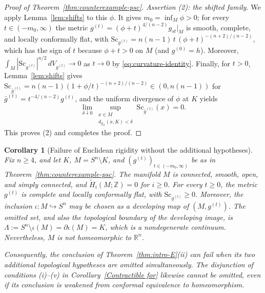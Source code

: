 \documentclass[12pt,oneside,a4paper]{article}
\theoremstyle{mytheorem}
\newtheorem{corollary}[definition]{Corollary}
\theoremstyle{remark}
\theoremstyle{definition}
\begin{document}
\begin{proof}[Proof of Theorem~\ref{thm:counterexample-psc}]
\smallskip\noindent\emph{Assertion (2): the shifted family.}
We apply Lemma~\ref{lem:shifts} to this $\phi$.  It gives
$m_0=\inf_M\phi>0$; for every $t\in(-m_0,\infty)$ the metric
$g^{(t)}=(\phi+t)^{4/(n-2)}g_{st}|_M$ is smooth, complete, and
locally conformally flat, with
$\mathrm{Sc}_{g^{(t)}}=n(n-1)\,t\,(\phi+t)^{-(n+2)/(n-2)},$
which has the sign of $t$ because $\phi+t>0$ on $M$ (and $g^{(0)}=h$).
Moreover,
$\int_M|\mathrm{Sc}_{g^{(t)}}|^{n/2}\,dV_{g^{(t)}}\to0$ as $t\to0$
by \eqref{eq:curvature-identity}.  Finally, for $t>0$,
Lemma~\ref{lem:shifts} gives
$\mathrm{Sc}_{\bar g^{(t)}}=n(n-1)(1+\phi/t)^{-(n+2)/(n-2)}\in(0,n(n-1))$
for $\bar g^{(t)}=t^{-4/(n-2)}g^{(t)}$, and the uniform divergence of
$\phi$ at $K$ yields
\[
 \lim_{\delta\downarrow0}
 \sup_{\substack{x\in M\\ d_{g_{st}}(x,K)<\delta}}
 \mathrm{Sc}_{\bar g^{(t)}}(x)=0.
\]
This proves (2) and completes the proof.
\end{proof}


\begin{corollary}[Failure of Euclidean rigidity without the
additional hypotheses]\label{cor:sharpness}
Fix $n\geq4$, and let $K$, $M=S^n\setminus K$, and
$(g^{(t)})_{t\in(-m_0,\infty)}$ be as in Theorem~\ref{thm:counterexample-psc}.  The
manifold $M$ is connected, smooth, open, and simply connected, and
\(\widetilde H_i(M;\mathbb Z)=0\) for \(i\geq0\).
For every $t\geq0$, the metric $g^{(t)}$ is complete and locally
conformally flat, with
$\mathrm{Sc}_{g^{(t)}}\geq0$.  Moreover, the inclusion
$\iota:M\hookrightarrow S^n$ may be chosen as a developing map of
$(M,g^{(t)})$.  The omitted set, and also the topological boundary of
the developing image, is
$\Lambda:=S^n\setminus\iota(M)=\partial\iota(M)=K$,
which is a nondegenerate continuum.  Nevertheless, $M$ is not
homeomorphic to $\mathbb R^n$.

Consequently, the conclusion of Theorem~\ref{thm:intro-E}\textup{(ii)} can fail
when its two additional topological hypotheses are omitted
simultaneously.  The disjunction of conditions
\textup{(i)}--\textup{(v)} in Corollary~\ref{Contractible for} likewise
cannot be omitted, even if its conclusion is weakened from conformal
equivalence to homeomorphism.
\end{corollary}
\end{document}
